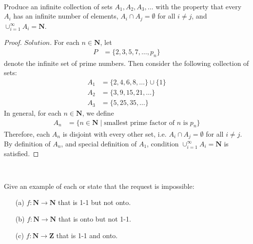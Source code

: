 \documentclass{article}
\begin{document}
\\
\par
\begin{Prob}[Ex. 1.2.4]
Produce an infinite collection of sets $A_1, A_2, A_3,\dots$ with the property that every $A_i$ has an infinite number of elements, $A_i\cap A_j=\emptyset$ for all $i\neq j$, and $\cup_{i=1}^{\infty} A_i=\mathbf{N}$.
\end{Prob}

\begin{proof}
$Solution.$ For each $n \in \mathbf{N}$, let
\begin{align*}
    P & = \{2, 3, 5, 7, \ldots, p_n\}
\end{align*}
denote the infinite set of prime numbers. Then consider the following collection of sets:
\begin{align*}
    A_1 & = \{2, 4, 6, 8, \ldots\} \cup \{1\} \\
    A_2 & = \{3, 9, 15, 21, \ldots\} \\
    A_3 & = \{5, 25, 35, \ldots\}
\end{align*}
In general, for each $n \in \mathbf{N}$, we define
\begin{align*}
    A_n & = \{n \in \mathbf{N} \; | \; \textrm{smallest prime factor of } n \textrm{ is } p_n\}
\end{align*}
Therefore, each $A_n$ is disjoint with every other set, i.e. $A_i \cap A_j = \emptyset$ for all $i \neq j$. By definition of $A_n$, and special definition of $A_1$, condition $\cup_{i=1}^{\infty} A_i=\mathbf{N}$ is satisfied.
\end{proof}
\\
\par
\begin{Prob}[Ex. 1.2.8] Give an example of each or state that the request is impossible:
\begin{enumerate}
\item[(a)] $f:\mathbf{N}\to \mathbf{N}$ that is 1-1 but not onto.
\item[(b)]  $f:\mathbf{N}\to \mathbf{N}$ that is  onto but not 1-1.
\item[(c)] $f:\mathbf{N}\to \mathbf{Z}$ that is 1-1 and onto.
\end{enumerate}
\end{Prob}
\end{document}
